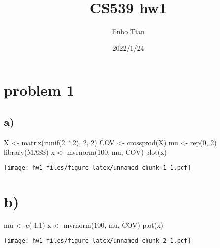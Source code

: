 \documentclass[
]{article}
\title{CS539 hw1}
\author{Enbo Tian}
\date{2022/1/24}
\newenvironment{Shaded}{\begin{snugshade}}{\end{snugshade}}
\newcommand{\DecValTok}[1]{\textcolor[rgb]{0.00,0.00,0.81}{#1}}
\newcommand{\FunctionTok}[1]{\textcolor[rgb]{0.00,0.00,0.00}{#1}}
\newcommand{\NormalTok}[1]{#1}
\newcommand{\OtherTok}[1]{\textcolor[rgb]{0.56,0.35,0.01}{#1}}
\newcommand{\SpecialCharTok}[1]{\textcolor[rgb]{0.00,0.00,0.00}{#1}}
\begin{document}
\maketitle

\hypertarget{problem-1}{%
\section{problem 1}\label{problem-1}}

\hypertarget{a}{%
\subsection{a)}\label{a}}

\begin{Shaded}
\begin{Highlighting}[]
\NormalTok{X }\OtherTok{\textless{}{-}} \FunctionTok{matrix}\NormalTok{(}\FunctionTok{runif}\NormalTok{(}\DecValTok{2} \SpecialCharTok{*} \DecValTok{2}\NormalTok{), }\DecValTok{2}\NormalTok{, }\DecValTok{2}\NormalTok{)}
\NormalTok{COV }\OtherTok{\textless{}{-}} \FunctionTok{crossprod}\NormalTok{(X)}
\NormalTok{mu }\OtherTok{\textless{}{-}} \FunctionTok{rep}\NormalTok{(}\DecValTok{0}\NormalTok{, }\DecValTok{2}\NormalTok{)}
\FunctionTok{library}\NormalTok{(MASS)}
\NormalTok{x }\OtherTok{\textless{}{-}} \FunctionTok{mvrnorm}\NormalTok{(}\DecValTok{100}\NormalTok{, mu, COV)}
\FunctionTok{plot}\NormalTok{(x)}
\end{Highlighting}
\end{Shaded}

\texttt{[image: hw1\_files/figure-latex/unnamed-chunk-1-1.pdf]}

\hypertarget{b}{%
\section{b)}\label{b}}

\begin{Shaded}
\begin{Highlighting}[]
\NormalTok{mu }\OtherTok{\textless{}{-}} \FunctionTok{c}\NormalTok{(}\SpecialCharTok{{-}}\DecValTok{1}\NormalTok{,}\DecValTok{1}\NormalTok{)}
\NormalTok{x }\OtherTok{\textless{}{-}} \FunctionTok{mvrnorm}\NormalTok{(}\DecValTok{100}\NormalTok{, mu, COV)}
\FunctionTok{plot}\NormalTok{(x)}
\end{Highlighting}
\end{Shaded}

\texttt{[image: hw1\_files/figure-latex/unnamed-chunk-2-1.pdf]}
\end{document}
